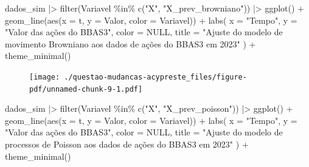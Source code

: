 \documentclass[
  letterpaper,
  DIV=11,
  numbers=noendperiod]{scrreprt}
\newenvironment{Shaded}{\begin{snugshade}}{\end{snugshade}}
\newcommand{\AttributeTok}[1]{\textcolor[rgb]{0.40,0.45,0.13}{#1}}
\newcommand{\ConstantTok}[1]{\textcolor[rgb]{0.56,0.35,0.01}{#1}}
\newcommand{\FunctionTok}[1]{\textcolor[rgb]{0.28,0.35,0.67}{#1}}
\newcommand{\NormalTok}[1]{\textcolor[rgb]{0.00,0.23,0.31}{#1}}
\newcommand{\SpecialCharTok}[1]{\textcolor[rgb]{0.37,0.37,0.37}{#1}}
\newcommand{\StringTok}[1]{\textcolor[rgb]{0.13,0.47,0.30}{#1}}
\begin{document}
\begin{Shaded}
\begin{Highlighting}[]
\NormalTok{dados\_sim }\SpecialCharTok{|\textgreater{}}
    \FunctionTok{filter}\NormalTok{(Variavel }\SpecialCharTok{\%in\%} \FunctionTok{c}\NormalTok{(}\StringTok{"X"}\NormalTok{, }\StringTok{"X\_prev\_browniano"}\NormalTok{)) }\SpecialCharTok{|\textgreater{}}
    \FunctionTok{ggplot}\NormalTok{() }\SpecialCharTok{+}
    \FunctionTok{geom\_line}\NormalTok{(}\FunctionTok{aes}\NormalTok{(}\AttributeTok{x =}\NormalTok{ t, }\AttributeTok{y =}\NormalTok{ Valor, }\AttributeTok{color =}\NormalTok{ Variavel)) }\SpecialCharTok{+}
    \FunctionTok{labs}\NormalTok{(}
        \AttributeTok{x =} \StringTok{"Tempo"}\NormalTok{,}
        \AttributeTok{y =} \StringTok{"Valor das ações do BBAS3"}\NormalTok{,}
        \AttributeTok{color =} \ConstantTok{NULL}\NormalTok{,}
        \AttributeTok{title =} \StringTok{"Ajuste do modelo de movimento Browniano}
\StringTok{          aos dados de ações do BBAS3 em 2023"}
\NormalTok{    ) }\SpecialCharTok{+}
    \FunctionTok{theme\_minimal}\NormalTok{()}
\end{Highlighting}
\end{Shaded}

\begin{figure}[H]

{\centering \texttt{[image: ./questao-mudancas-acypreste\_files/figure-pdf/unnamed-chunk-9-1.pdf]}

}

\end{figure}

\begin{Shaded}
\begin{Highlighting}[]
\NormalTok{dados\_sim }\SpecialCharTok{|\textgreater{}}
    \FunctionTok{filter}\NormalTok{(Variavel }\SpecialCharTok{\%in\%} \FunctionTok{c}\NormalTok{(}\StringTok{"X"}\NormalTok{, }\StringTok{"X\_prev\_poisson"}\NormalTok{)) }\SpecialCharTok{|\textgreater{}}
    \FunctionTok{ggplot}\NormalTok{() }\SpecialCharTok{+}
    \FunctionTok{geom\_line}\NormalTok{(}\FunctionTok{aes}\NormalTok{(}\AttributeTok{x =}\NormalTok{ t, }\AttributeTok{y =}\NormalTok{ Valor, }\AttributeTok{color =}\NormalTok{ Variavel)) }\SpecialCharTok{+}
    \FunctionTok{labs}\NormalTok{(}
        \AttributeTok{x =} \StringTok{"Tempo"}\NormalTok{,}
        \AttributeTok{y =} \StringTok{"Valor das ações do BBAS3"}\NormalTok{,}
        \AttributeTok{color =} \ConstantTok{NULL}\NormalTok{,}
        \AttributeTok{title =} \StringTok{"Ajuste do modelo de processos de Poisson}
\StringTok{          aos dados de ações do BBAS3 em 2023"}
\NormalTok{    ) }\SpecialCharTok{+}
    \FunctionTok{theme\_minimal}\NormalTok{()}
\end{Highlighting}
\end{Shaded}
\end{document}
